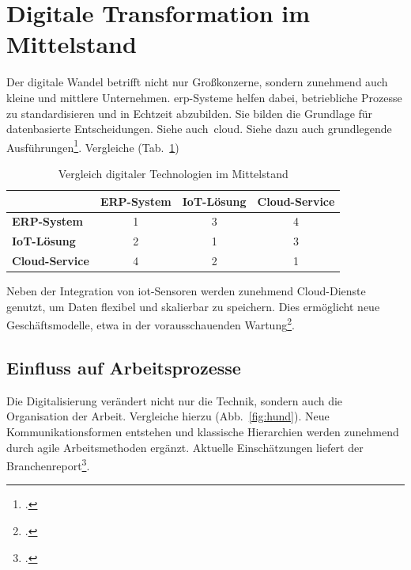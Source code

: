 \section{Digitale Transformation im Mittelstand}



Der digitale Wandel betrifft nicht nur Großkonzerne, sondern zunehmend auch kleine und mittlere Unternehmen. 
\acrshort{erp}-Systeme helfen dabei, betriebliche Prozesse zu standardisieren und in Echtzeit abzubilden. 
Sie bilden die Grundlage für datenbasierte Entscheidungen. 
Siehe auch~\gls{cloud}. Siehe dazu auch grundlegende Ausführungen\footcite[vgl.][S.~101]{mustermann2021-chapter}. Vergleiche (Tab.~\ref{tab:tech-vergleich})

\begin{table}[H]
    \centering
    \small
    \begin{tabular}{lccc}
        \toprule
                        & \textbf{ERP-System} & \textbf{IoT-Lösung} & \textbf{Cloud-Service} \\
        \midrule
        \textbf{ERP-System}   & 1    & 3    & 4    \\
        \textbf{IoT-Lösung}   & 2    & 1    & 3    \\
        \textbf{Cloud-Service}& 4    & 2    & 1    \\
        \bottomrule
    \end{tabular}
    \caption[Vergleich digitaler Technologien]{Vergleich digitaler Technologien im Mittelstand\protect\footnotemark}
    \label{tab:tech-vergleich}
\end{table}

Neben der Integration von \acrshort{iot}-Sensoren werden zunehmend Cloud-Dienste genutzt, um Daten flexibel und skalierbar zu speichern. 
Dies ermöglicht neue Geschäftsmodelle, etwa in der vorausschauenden Wartung\footcite[vgl.][S.~60]{muster2023-article}.  

\subsection{Einfluss auf Arbeitsprozesse}

Die Digitalisierung verändert nicht nur die Technik, sondern auch die Organisation der Arbeit. 
Vergleiche hierzu (Abb.~\ref{fig:hund}). 
Neue Kommunikationsformen entstehen und klassische Hierarchien werden zunehmend durch agile Arbeitsmethoden ergänzt. 
Aktuelle Einschätzungen liefert der Branchenreport\footcite{muster2024-online}.  

